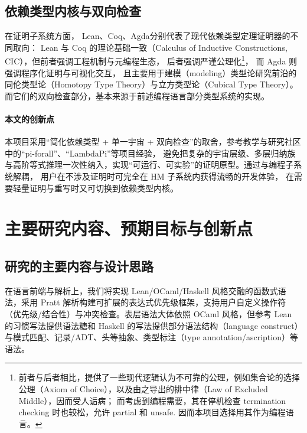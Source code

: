 \subsection{依赖类型内核与双向检查} 在证明子系统方面，
Lean、Coq、Agda分别代表了现代依赖类型定理证明器的不同取向：
Lean 与 Coq 的理论基础一致（Calculus of Inductive Constructions, CIC），但前者强调工程机制与元编程生态，
后者强调严谨公理化\footnote{
  前者与后者相比，提供了一些现代逻辑认为不可靠的公理，例如集合论的选择公理（Axiom of Choice），以及由之导出的排中律（Law of Excluded Middle），因而受人诟病；
  而考虑到编程需要，其在停机检查 termination checking 时也较松，允许 partial 和 unsafe. 因而本项目选择用其作为编程语言。
}，
而 Agda 则强调程序化证明与可视化交互，
且主要用于建模（modeling）类型论研究前沿的同伦类型论（Homotopy Type Theory）与立方类型论（Cubical Type Theory）。
而它们的双向检查部分，基本来源于前述编程语言部分类型系统的实现。

\paragraph{本文的创新点}本项目采用“简化依赖类型 + 单一宇宙 + 双向检查”的取舍，参考教学与研究社区中的“pi-forall”、“LambdaPi”等项目经验，
避免把复杂的宇宙层级、多层归纳族与高阶等式推理一次性纳入，实现“可运行、可实验”的证明原型。通过与编程子系统解耦，
用户在不涉及证明时可完全在 HM 子系统内获得流畅的开发体验，
在需要轻量证明与重写时又可切换到依赖类型内核。

\section{主要研究内容、预期目标与创新点}
\subsection{研究的主要内容与设计思路}

在语言前端与解析上，我们将实现 Lean/OCaml/Haskell 风格交融的函数式语法，采用 Pratt 解析构建可扩展的表达式优先级框架，支持用户自定义操作符（优先级/结合性）与冲突检查。表层语法大体依照 OCaml 风格，但参考 Lean 的习惯写法提供语法糖和 Haskell 的写法提供部分语法结构（language construct）与模式匹配、记录/ADT、头等抽象、类型标注（type annotation/ascription）等语法。

